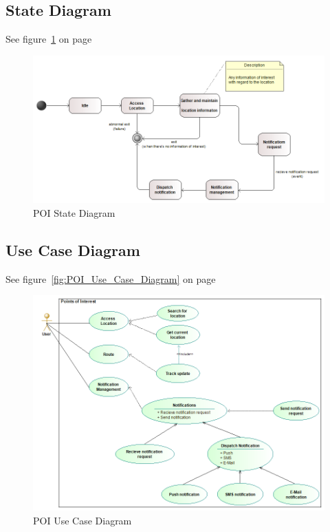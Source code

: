  \subsection{State Diagram}
See figure~\ref{fig:POI_State_Diagram} on page~\pageref{fig:POI_State_Diagram}
\begin{figure}
	\centering
	\includegraphics[scale=0.54]{POI/poi_state_diagram.png}
	\caption{POI State Diagram}
	\label{fig:POI_State_Diagram}
\end{figure}
		
 \subsection{Use Case Diagram}
See figure~\ref{fig:POI_Use_Case_Diagram} on page~\pageref{fig:POI_Use_Case_Diagram}
\begin{figure}
	\centering
	\includegraphics[scale=0.54]{POI/poi_use_case_diagram.png}
	\caption{POI Use Case Diagram}
	\label{fig:POI_Use_Casee_Diagram}
\end{figure}
